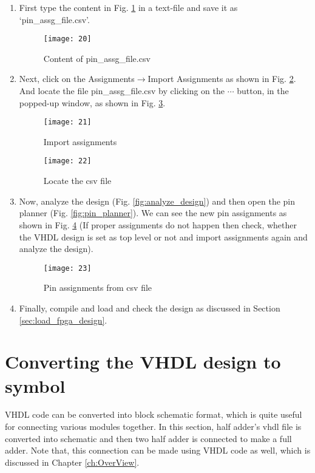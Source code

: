 \begin{enumerate}
	\item First type the content in Fig. \ref{fig:pin_ass_csv} in a text-file and save it as `pin\_assg\_file.csv'. 
	
		\begin{figure}[!h]
			\centering
			\texttt{[image: 20]}
			\caption{Content of pin\_assg\_file.csv}
			\label{fig:pin_ass_csv}
		\end{figure}
		
	\item Next, click on the Assignments$\rightarrow$Import Assignments as shown in Fig. \ref{fig:import_assg}. And locate the file pin\_assg\_file.csv by clicking on the $\cdots$ button, in the popped-up window, as shown in Fig. \ref{fig:locate_assg}. 
	
		\begin{figure}
			\centering
			\texttt{[image: 21]}
			\caption{Import assignments}
			\label{fig:import_assg}
		\end{figure}
		
		\begin{figure}[!h]
			\centering
			\texttt{[image: 22]}
			\caption{Locate the csv file}
			\label{fig:locate_assg}
		\end{figure}
		
	\item Now, analyze the design (Fig. \ref{fig:analyze_design}) and then open the pin planner (Fig. \ref{fig:pin_planner}). We can see the new pin assignments as shown in Fig. \ref{fig:pin_assg_from_csv} (If proper assignments do not happen then check, whether the VHDL design is set as top level or not and import assignments again and analyze the design). 
	
		\begin{figure}
			\centering
			\texttt{[image: 23]}
			\caption{Pin assignments from csv file}
			\label{fig:pin_assg_from_csv}
		\end{figure}
		
	\item Finally, compile and load and check the design as discussed in Section \ref{sec:load_fpga_design}. 
\end{enumerate}


\section{Converting the VHDL design to symbol} \label{sec:vhdl_to_symbol}
VHDL code can be converted into block schematic format,  which is quite useful for connecting various modules together. In this section, half adder's vhdl file is converted into schematic and then two half adder is connected to make a full adder. Note that, this connection can be made using VHDL code as well, which is discussed in Chapter \ref{ch:OverView}. 

